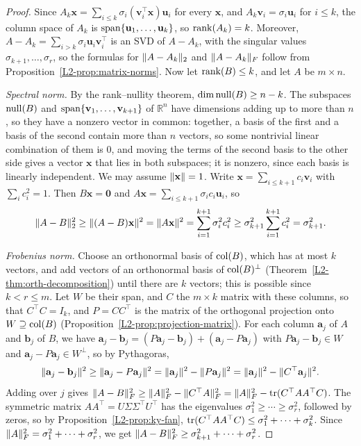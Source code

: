 \begin{proof}
    Since $A_k\mathbf{x} = \sum_{i \leq k} \sigma_i (\mathbf{v}_i^\top \mathbf{x}) \mathbf{u}_i$ for every $\mathbf{x}$, and $A_k\mathbf{v}_i = \sigma_i \mathbf{u}_i$ for $i \leq k$, the column space of $A_k$ is $\operatorname{span}\{\mathbf{u}_1, \ldots, \mathbf{u}_k\}$, so $\operatorname{rank}(A_k) = k$. Moreover, $A - A_k = \sum_{i > k} \sigma_i \mathbf{u}_i \mathbf{v}_i^\top$ is an SVD of $A - A_k$, with the singular values $\sigma_{k+1}, \ldots, \sigma_r$, so the formulas for $\lVert A - A_k \rVert_2$ and $\lVert A - A_k \rVert_F$ follow from Proposition~\ref{L2-prop:matrix-norms}. Now let $\operatorname{rank}(B) \leq k$, and let $A$ be $m \times n$.

    \emph{Spectral norm.} By the rank--nullity theorem, $\dim\operatorname{null}(B) \geq n - k$. The subspaces $\operatorname{null}(B)$ and $\operatorname{span}\{\mathbf{v}_1, \ldots, \mathbf{v}_{k+1}\}$ of $\mathbb{R}^n$ have dimensions adding up to more than $n$, so they have a nonzero vector in common: together, a basis of the first and a basis of the second contain more than $n$ vectors, so some nontrivial linear combination of them is $0$, and moving the terms of the second basis to the other side gives a vector $\mathbf{x}$ that lies in both subspaces; it is nonzero, since each basis is linearly independent. We may assume $\lVert \mathbf{x} \rVert = 1$. Write $\mathbf{x} = \sum_{i \leq k+1} c_i \mathbf{v}_i$ with $\sum_i c_i^2 = 1$. Then $B\mathbf{x} = \mathbf{0}$ and $A\mathbf{x} = \sum_{i \leq k+1} \sigma_i c_i \mathbf{u}_i$, so
    \[\lVert A - B \rVert_2^2 \geq \lVert (A - B)\mathbf{x} \rVert^2 = \lVert A\mathbf{x} \rVert^2 = \sum_{i=1}^{k+1} \sigma_i^2 c_i^2 \geq \sigma_{k+1}^2 \sum_{i=1}^{k+1} c_i^2 = \sigma_{k+1}^2.\]

    \emph{Frobenius norm.} Choose an orthonormal basis of $\operatorname{col}(B)$, which has at most $k$ vectors, and add vectors of an orthonormal basis of $\operatorname{col}(B)^\perp$ (Theorem~\ref{L2-thm:orth-decomposition}) until there are $k$ vectors; this is possible since $k < r \leq m$. Let $W$ be their span, and $C$ the $m \times k$ matrix with these columns, so that $C^\top C = I_k$, and $P = CC^\top$ is the matrix of the orthogonal projection onto $W \supseteq \operatorname{col}(B)$ (Proposition~\ref{L2-prop:projection-matrix}). For each column $\mathbf{a}_j$ of $A$ and $\mathbf{b}_j$ of $B$, we have $\mathbf{a}_j - \mathbf{b}_j = (P\mathbf{a}_j - \mathbf{b}_j) + (\mathbf{a}_j - P\mathbf{a}_j)$ with $P\mathbf{a}_j - \mathbf{b}_j \in W$ and $\mathbf{a}_j - P\mathbf{a}_j \in W^\perp$, so by Pythagoras,
    \[\lVert \mathbf{a}_j - \mathbf{b}_j \rVert^2 \geq \lVert \mathbf{a}_j - P\mathbf{a}_j \rVert^2 = \lVert \mathbf{a}_j \rVert^2 - \lVert P\mathbf{a}_j \rVert^2 = \lVert \mathbf{a}_j \rVert^2 - \lVert C^\top \mathbf{a}_j \rVert^2.\]
    Adding over $j$ gives $\lVert A - B \rVert_F^2 \geq \lVert A \rVert_F^2 - \lVert C^\top A \rVert_F^2 = \lVert A \rVert_F^2 - \operatorname{tr}(C^\top AA^\top C)$. The symmetric matrix $AA^\top = U\Sigma\Sigma^\top U^\top$ has the eigenvalues $\sigma_1^2 \geq \cdots \geq \sigma_r^2$, followed by zeros, so by Proposition~\ref{L2-prop:ky-fan}, $\operatorname{tr}(C^\top AA^\top C) \leq \sigma_1^2 + \cdots + \sigma_k^2$. Since $\lVert A \rVert_F^2 = \sigma_1^2 + \cdots + \sigma_r^2$, we get $\lVert A - B \rVert_F^2 \geq \sigma_{k+1}^2 + \cdots + \sigma_r^2$.
\end{proof}

